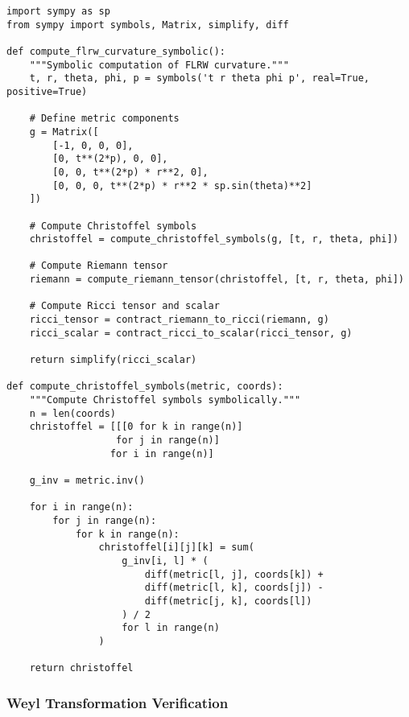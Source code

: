\begin{verbatim}
import sympy as sp
from sympy import symbols, Matrix, simplify, diff

def compute_flrw_curvature_symbolic():
    """Symbolic computation of FLRW curvature."""
    t, r, theta, phi, p = symbols('t r theta phi p', real=True, positive=True)
    
    # Define metric components
    g = Matrix([
        [-1, 0, 0, 0],
        [0, t**(2*p), 0, 0],
        [0, 0, t**(2*p) * r**2, 0],
        [0, 0, 0, t**(2*p) * r**2 * sp.sin(theta)**2]
    ])
    
    # Compute Christoffel symbols
    christoffel = compute_christoffel_symbols(g, [t, r, theta, phi])
    
    # Compute Riemann tensor
    riemann = compute_riemann_tensor(christoffel, [t, r, theta, phi])
    
    # Compute Ricci tensor and scalar
    ricci_tensor = contract_riemann_to_ricci(riemann, g)
    ricci_scalar = contract_ricci_to_scalar(ricci_tensor, g)
    
    return simplify(ricci_scalar)

def compute_christoffel_symbols(metric, coords):
    """Compute Christoffel symbols symbolically."""
    n = len(coords)
    christoffel = [[[0 for k in range(n)] 
                   for j in range(n)] 
                  for i in range(n)]
    
    g_inv = metric.inv()
    
    for i in range(n):
        for j in range(n):
            for k in range(n):
                christoffel[i][j][k] = sum(
                    g_inv[i, l] * (
                        diff(metric[l, j], coords[k]) +
                        diff(metric[l, k], coords[j]) -
                        diff(metric[j, k], coords[l])
                    ) / 2
                    for l in range(n)
                )
    
    return christoffel
\end{verbatim}

\subsubsection{Weyl Transformation Verification}

